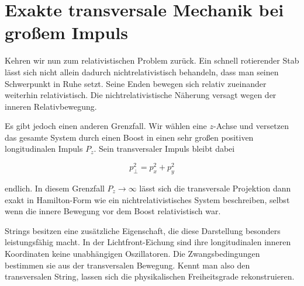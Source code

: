 \section{Exakte transversale Mechanik bei großem Impuls}

Kehren wir nun zum relativistischen Problem zurück. Ein schnell rotierender Stab lässt sich nicht allein dadurch nichtrelativistisch behandeln, dass man seinen Schwerpunkt in Ruhe setzt. Seine Enden bewegen sich relativ zueinander weiterhin relativistisch. Die nichtrelativistische Näherung versagt wegen der inneren Relativbewegung.

Es gibt jedoch einen anderen Grenzfall. Wir wählen eine \(z\)-Achse und versetzen das gesamte System durch einen Boost in einen sehr großen positiven longitudinalen Impuls \(P_z\). Sein transversaler Impuls bleibt dabei

\begin{equation}
  p_\perp^2=p_x^2+p_y^2
\end{equation}

endlich. In diesem Grenzfall \(P_z\to\infty\) lässt sich die transversale Projektion dann exakt in Hamilton-Form wie ein nichtrelativistisches System beschreiben, selbst wenn die innere Bewegung vor dem Boost relativistisch war.

\begin{classroomqa}
\end{classroomqa}

\begin{classroomqa}
\end{classroomqa}

Strings besitzen eine zusätzliche Eigenschaft, die diese Darstellung besonders leistungsfähig macht. In der Lichtfront-Eichung sind ihre longitudinalen inneren Koordinaten keine unabhängigen Oszillatoren. Die Zwangsbedingungen bestimmen sie aus der transversalen Bewegung. Kennt man also den transversalen String, lassen sich die physikalischen Freiheitsgrade rekonstruieren.

